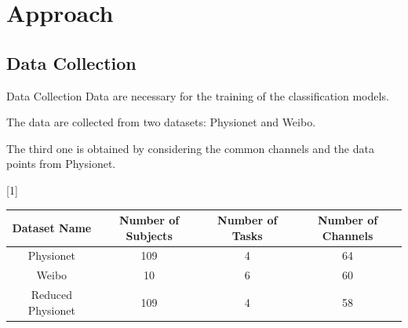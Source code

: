 \section{Approach}

\subsection*{Data Collection}
\begin{frame}{Data Collection}
    Data are necessary for the training of the classification models. 
    
    \vspace*{.5cm}
    The data are collected from two datasets: Physionet and Weibo.
    
    \vspace*{.5cm}
    The third one is obtained by considering the common channels and the data points from Physionet.
    \begin{table}[!htbp] 
        \centering 
        \scalebox{.7}[1]{
            \begin{tabular}{|c|c|c|c|} 
                \hline 
                \textbf{Dataset Name} & \textbf{Number of
    Subjects} & \textbf{Number of Tasks} & \textbf{Number of Channels}\\
                \hline
                \hline 
                Physionet & 109 & 4 & 64\\ 
                \hline 
                Weibo & 10 & 6 & 60\\ 
                \hline 
                \hline
                Reduced Physionet & 109 & 4 & 58\\
                \hline 
            \end{tabular} 
        }
    \end{table}
\end{frame}

